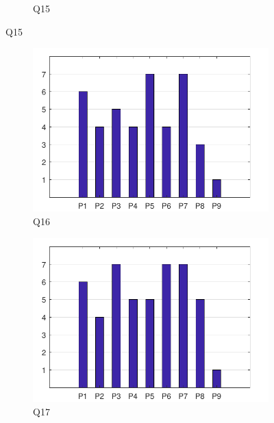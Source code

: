 \documentclass[english, 12pt, a4paper, pdftex, elec, utf8]{aaltothesis}
\begin{document}
\begin{figure}[h!]
\begin{subfigure}[b]{0.49\textwidth}
		\caption*{Q15}
	\end{subfigure}
\end{figure}

\begin{figure}[h!]
	\centering
	\begin{subfigure}[b]{0.49\textwidth}
		\includegraphics[width=\textwidth]{T2_7.pdf}
		\caption*{Q16}
	\end{subfigure}
	\begin{subfigure}[b]{0.49\textwidth}
		\includegraphics[width=\textwidth]{T2_8.pdf}
		\caption*{Q17}
	\end{subfigure}
	\begin{subfigure}[b]{0.49\textwidth}

\end{subfigure}
\end{figure}
\end{document}

